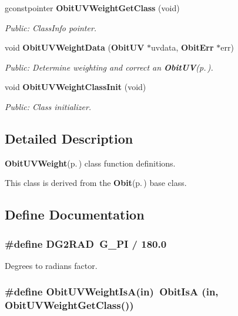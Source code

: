 \begin{CompactItemize}
gconstpointer {\bf Obit\-UVWeight\-Get\-Class} (void)
\begin{CompactList}\small\item\em Public: Class\-Info pointer. \item\end{CompactList}\item 
void {\bf Obit\-UVWeight\-Data} ({\bf Obit\-UV} $\ast$uvdata, {\bf Obit\-Err} $\ast$err)
\begin{CompactList}\small\item\em Public: Determine weighting and correct an {\bf Obit\-UV}{\rm (p.\,\pageref{structObitUV})}. \item\end{CompactList}\item 
void {\bf Obit\-UVWeight\-Class\-Init} (void)
\begin{CompactList}\small\item\em Public: Class initializer. \item\end{CompactList}\end{CompactItemize}


\subsection{Detailed Description}
{\bf Obit\-UVWeight}{\rm (p.\,\pageref{structObitUVWeight})} class function definitions. 

This class is derived from the {\bf Obit}{\rm (p.\,\pageref{structObit})} base class.

\subsection{Define Documentation}
\subsubsection{\setlength{\rightskip}{0pt plus 5cm}\#define DG2RAD\ G\_\-PI / 180.0}\label{ObitUVWeight_8c_a0}


Degrees to radians factor. 

\subsubsection{\setlength{\rightskip}{0pt plus 5cm}\#define Obit\-UVWeight\-Is\-A(in)\ Obit\-Is\-A (in, Obit\-UVWeight\-Get\-Class())}\label{ObitUVWeight_8c_a4}


